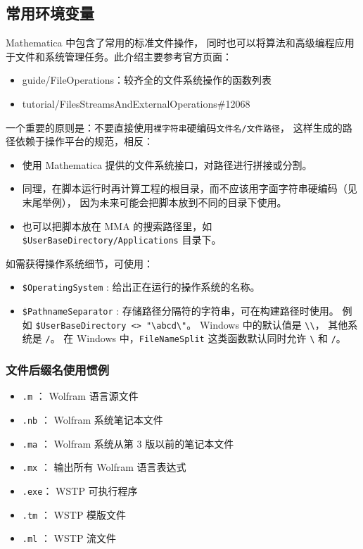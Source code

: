 
\begin{issues}
\issueDraft
\issueTODO
\end{issues}

\subsection{常用环境变量}

Mathematica 中包含了常用的标准文件操作，
同时也可以将算法和高级编程应用于文件和系统管理任务。此介绍主要参考官方页面：

\begin{itemize}
\item guide/FileOperations：较齐全的文件系统操作的函数列表
\item tutorial/FilesStreamsAndExternalOperations\#12068
\end{itemize}

一个重要的原则是：不要直接使用\verb`裸字符串`硬编码\verb`文件名/文件路径`， 
这样生成的路径依赖于操作平台的规范，相反：
\begin{itemize}
\item 使用 Mathematica 提供的文件系统接口，对路径进行拼接或分割。
\item 同理，在脚本运行时再计算工程的根目录，而不应该用字面字符串硬编码（见末尾举例），
因为未来可能会把脚本放到不同的目录下使用。
\item 也可以把脚本放在 MMA 的搜索路径里，如 \verb`$UserBaseDirectory/Applications` 目录下。
\end{itemize}

如需获得操作系统细节，可使用：
\begin{itemize}
\item \verb`$OperatingSystem` : 给出正在运行的操作系统的名称。
\item \verb`$PathnameSeparator` : 存储路径分隔符的字符串，可在构建路径时使用。
例如 \verb|$UserBaseDirectory <> "\abcd\"|。 
Windows 中的默认值是 \verb|\\|， 其他系统是 \verb|/|。
在 Windows 中，\verb`FileNameSplit` 这类函数默认同时允许 \verb|\| 和 \verb|/|。
\end{itemize}

\subsubsection{文件后缀名使用惯例}

\begin{itemize}
\item \verb`.m`  ： Wolfram 语言源文件
\item \verb`.nb` ： Wolfram 系统笔记本文件
\item \verb`.ma` ： Wolfram 系统从第 $3$ 版以前的笔记本文件
\item \verb`.mx` ： 输出所有 Wolfram 语言表达式
\item \verb`.exe`： WSTP 可执行程序
\item \verb`.tm` ： WSTP 模版文件
\item \verb`.ml` ： WSTP 流文件
\end{itemize}

